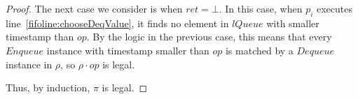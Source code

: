 \documentclass[a4paper,anonymous,USenglish]{lipics-v2021} %
\theoremstyle{definition}
\begin{document}
\begin{proof}
  The next case we consider is when $ret = \bot$.  In this case, when $p_i$ executes line~\ref{fifoline:chooseDeqValue}, it finds no element in $lQueue$ with smaller timestamp than $op$.  By the logic in the previous case, this means that every $Enqueue$ instance with timestamp smaller than $op$ is matched by a $Dequeue$ instance in $\rho$, so $\rho \cdot op$ is legal.

  Thus, by induction, $\pi$ is legal.
\end{proof}


%

  
\end{document}
